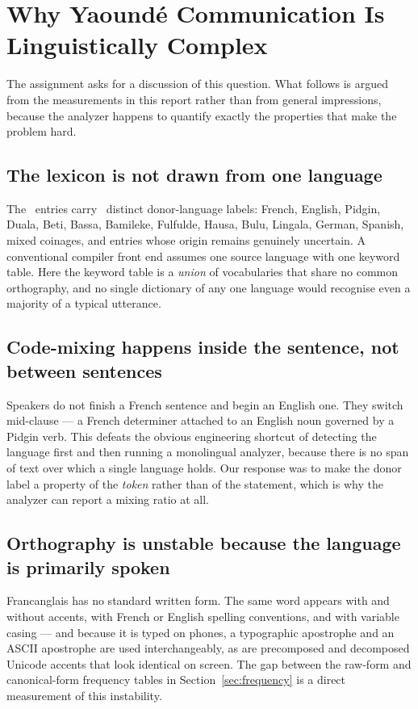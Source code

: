 \section{Why Yaound\'e Communication Is Linguistically Complex}\label{sec:complexity}

The assignment asks for a discussion of this question. What follows is argued from the
measurements in this report rather than from general impressions, because the analyzer
happens to quantify exactly the properties that make the problem hard.

\subsection{The lexicon is not drawn from one language}

The \LexiconTotal\ entries carry \OriginCount\ distinct donor-language labels: French,
English, Pidgin, Duala, Beti, Bassa, Bamileke, Fulfulde, Hausa, Bulu, Lingala, German,
Spanish, mixed coinages, and entries whose origin remains genuinely uncertain. A
conventional compiler front end assumes one source language with one keyword table. Here
the keyword table is a \emph{union} of vocabularies that share no common orthography, and
no single dictionary of any one language would recognise even a majority of a typical
utterance.

\subsection{Code-mixing happens inside the sentence, not between sentences}

Speakers do not finish a French sentence and begin an English one. They switch mid-clause
--- a French determiner attached to an English noun governed by a Pidgin verb. This defeats
the obvious engineering shortcut of detecting the language first and then running a
monolingual analyzer, because there is no span of text over which a single language holds.
Our response was to make the donor label a property of the \emph{token} rather than of the
statement, which is why the analyzer can report a mixing ratio at all.

\subsection{Orthography is unstable because the language is primarily spoken}

Francanglais has no standard written form. The same word appears with and without accents,
with French or English spelling conventions, and with variable casing --- and because it is
typed on phones, a typographic apostrophe and an ASCII apostrophe are used
interchangeably, as are precomposed and decomposed Unicode accents that look identical on
screen. The gap between the raw-form and canonical-form frequency tables in
Section~\ref{sec:frequency} is a direct measurement of this instability.

